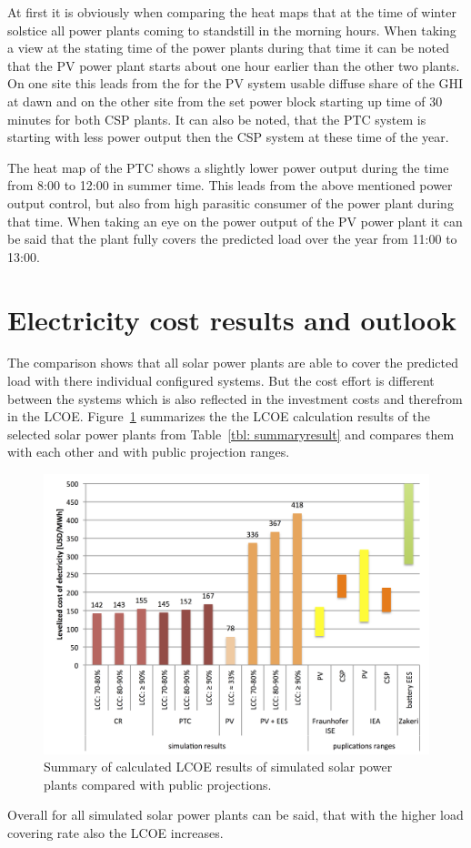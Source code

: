 At first it is obviously when comparing the heat maps that at the time of winter solstice all power plants coming to standstill in the morning hours. When taking a view at the stating time of the power plants during that time it can be noted that the PV power plant starts about one hour earlier than the other two plants. On one site this leads from the for the PV system usable diffuse share of the GHI at dawn and on the other site from the set power block starting up time of 30 minutes for both CSP plants. It can also be noted, that the PTC system is starting with less power output then the CSP system at these time of the year.

The heat map of the PTC shows a slightly lower power output during the time from 8:00 to 12:00 in summer time. This leads from the above mentioned power output control, but also from high parasitic consumer of the power plant during that time. When taking an eye on the power output of the PV power plant it can be said that the plant fully covers the predicted load over the year from 11:00 to 13:00.

\section{Electricity cost results and outlook}
The comparison shows that all solar power plants are able to cover the predicted load with there individual configured systems. But the cost effort is different between the systems which is also reflected in the investment costs and therefrom in the LCOE. Figure~\ref{LCOEcomparision} summarizes the the LCOE calculation results of the selected solar power plants from Table~\ref{tbl: summaryresult} and compares them with each other and with public projection ranges. 

\begin{figure}[htbp]  
\centering
\includegraphics[width=1\linewidth]{FIG/LCOEcomparision}
\caption[Summary of calculated LCOE results of simulated solar power plants compared with public projections.]{Summary of calculated LCOE results of simulated solar power plants compared with public projections.}\label{LCOEcomparision}
\end{figure}
Overall for all simulated solar power plants can be said, that with the higher load covering rate also the LCOE increases.

